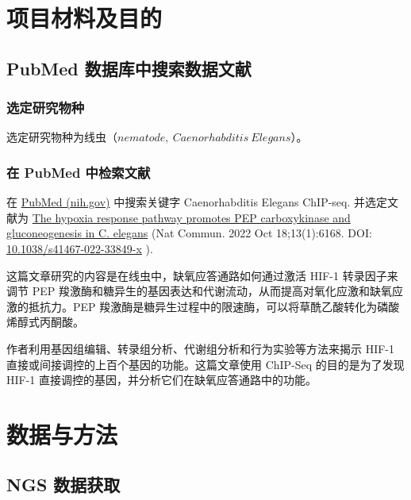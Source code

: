 \documentclass[UTF8]{ctexart}
\begin{document}
\clearpage

\thispagestyle{empty}
\tableofcontents
\setcounter{page}{0}

\clearpage

\section{项目材料及目的}

\subsection{PubMed 数据库中搜索数据文献}

\subsubsection{选定研究物种}

选定研究物种为线虫（$nematode,\ Caenorhabditis\ Elegans$）。

\subsubsection{在 PubMed 中检索文献}

在 \href{https://pubmed.ncbi.nlm.nih.gov/}{PubMed (nih.gov)} 中搜索关键字 Caenorhabditis Elegans ChIP-seq. 并选定文献为 \href{https://pubmed.ncbi.nlm.nih.gov/36257965/}{The hypoxia response pathway promotes PEP carboxykinase and gluconeogenesis in C. elegans} (Nat Commun. 2022 Oct 18;13(1):6168. DOI: \href{https://doi.org/10.1038/s41467-022-33849-x}{10.1038/s41467-022-33849-x} )\cite{ref1}.

这篇文章研究的内容是在线虫中，缺氧应答通路如何通过激活 HIF-1 转录因子来调节 PEP 羧激酶和糖异生的基因表达和代谢流动，从而提高对氧化应激和缺氧应激的抵抗力。PEP 羧激酶是糖异生过程中的限速酶，可以将草酰乙酸转化为磷酸烯醇式丙酮酸。

作者利用基因组编辑、转录组分析、代谢组分析和行为实验等方法来揭示 HIF-1 直接或间接调控的上百个基因的功能。这篇文章使用 ChIP-Seq 的目的是为了发现 HIF-1 直接调控的基因，并分析它们在缺氧应答通路中的功能。

\section{数据与方法}

\subsection{NGS 数据获取}
\end{document}

